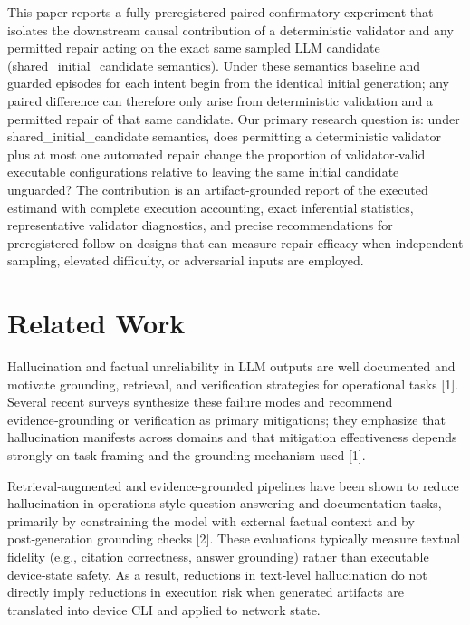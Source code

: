 \documentclass[conference]{IEEEtran}
\begin{document}
This paper reports a fully preregistered paired confirmatory experiment that isolates the downstream causal contribution of a deterministic validator and any permitted repair acting on the exact same sampled LLM candidate (shared\_initial\_candidate semantics). Under these semantics baseline and guarded episodes for each intent begin from the identical initial generation; any paired difference can therefore only arise from deterministic validation and a permitted repair of that same candidate. Our primary research question is: under shared\_initial\_candidate semantics, does permitting a deterministic validator plus at most one automated repair change the proportion of validator‑valid executable configurations relative to leaving the same initial candidate unguarded? The contribution is an artifact‑grounded report of the executed estimand with complete execution accounting, exact inferential statistics, representative validator diagnostics, and precise recommendations for preregistered follow‑on designs that can measure repair efficacy when independent sampling, elevated difficulty, or adversarial inputs are employed.

\section{Related Work}
Hallucination and factual unreliability in LLM outputs are well documented and motivate grounding, retrieval, and verification strategies for operational tasks [1]. Several recent surveys synthesize these failure modes and recommend evidence‑grounding or verification as primary mitigations; they emphasize that hallucination manifests across domains and that mitigation effectiveness depends strongly on task framing and the grounding mechanism used [1].

Retrieval‑augmented and evidence‑grounded pipelines have been shown to reduce hallucination in operations‑style question answering and documentation tasks, primarily by constraining the model with external factual context and by post‑generation grounding checks [2]. These evaluations typically measure textual fidelity (e.g., citation correctness, answer grounding) rather than executable device‑state safety. As a result, reductions in text‑level hallucination do not directly imply reductions in execution risk when generated artifacts are translated into device CLI and applied to network state.
\end{document}
